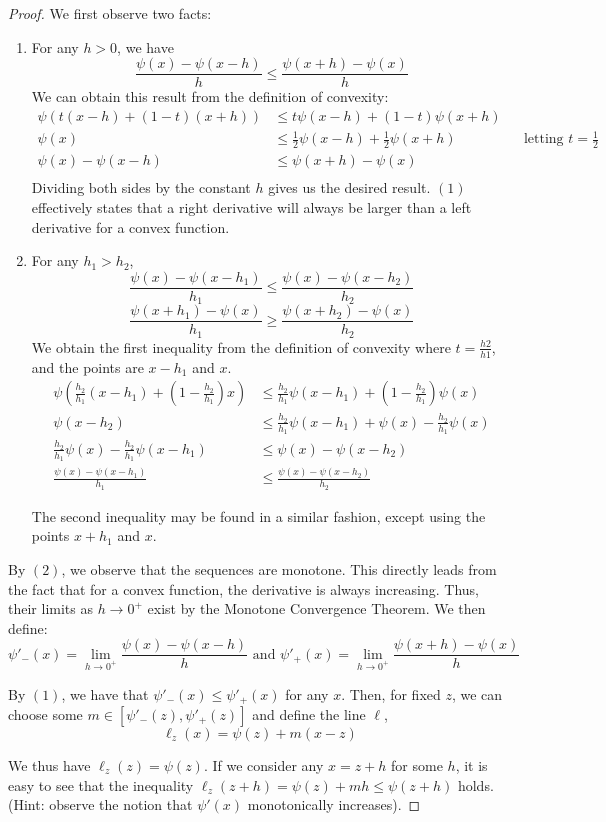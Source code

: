 \documentclass{article}
\begin{document}
\begin{proof}
We first observe two facts:
\begin{enumerate}
    \item For any $h > 0$, we have $$\frac{\psi(x)-\psi(x-h)}{h} \leq \frac{\psi(x+h)-\psi(x)}{h}$$
    We can obtain this result from the definition of convexity:
    \begin{align*}
        \psi(t(x-h) + (1-t)(x+h)) &\leq t\psi(x-h) + (1-t)\psi(x+h)\\
        \psi(x) &\leq \frac{1}{2}\psi(x-h)+\frac{1}{2}\psi(x+h)&&\text{letting $t = \frac{1}{2}$}\\
        \psi(x)-\psi(x-h) &\leq \psi(x+h)-\psi(x)\\
    \end{align*}
    Dividing both sides by the constant $h$ gives us the desired result. $(1)$
    effectively states that a right derivative will always be larger than a left
    derivative for a convex function.

    \item For any $h_1 > h_2$,
        $$\frac{\psi(x)-\psi(x-h_1)}{h_1} \leq \frac{\psi(x)-\psi(x-h_2)}{h_2}$$
        $$\frac{\psi(x+h_1) - \psi(x)}{h_1} \geq \frac{\psi(x+h_2)-\psi(x)}{h_2}$$
    We obtain the first inequality from the definition of convexity where $t = \frac{h2}{h1}$, and the points are $x-h_1$ and $x$.
    \begin{align*}
        \psi(\frac{h_2}{h_1}(x-h_1)+(1-\frac{h_2}{h_1})x) &\leq \frac{h_2}{h_1}\psi(x-h_1) + (1-\frac{h_2}{h_1})\psi(x)\\
        \psi(x-h_2) &\leq \frac{h_2}{h_1}\psi(x-h_1) + \psi(x) -\frac{h_2}{h_1}\psi(x)\\
        \frac{h_2}{h_1}\psi(x) - \frac{h_2}{h_1}\psi(x-h_1) &\leq \psi(x) - \psi(x-h_2)\\
        \frac{\psi(x)-\psi(x-h_1)}{h_1} &\leq \frac{\psi(x)-\psi(x-h_2)}{h_2}
    \end{align*}

    The second inequality may be found in a similar fashion, except using the
    points $x+h_1$ and $x$.
\end{enumerate}

By $(2)$, we observe that the sequences are monotone. This directly leads from
the fact that for a convex function, the derivative is always increasing. Thus,
their limits as $h \rightarrow 0^{+}$ exist by the Monotone Convergence Theorem.
We then define:
$$\psi'_{-}(x) = \lim_{h\rightarrow 0^{+}} \frac{\psi(x)-\psi(x-h)}{h} \text{ and } \psi'_{+}(x) = \lim_{h\rightarrow 0^{+}} \frac{\psi(x+h)-\psi(x)}{h}$$

By $(1)$, we have that $\psi'_{-}(x) \leq \psi'_{+}(x)$ for any $x$. Then, for
fixed $z$, we can choose some $m \in [\psi'_{-}(z), \psi'_{+}(z)]$ and define
the line $\ell$,
$$\ell_z(x) = \psi(z)+m(x-z)$$

We thus have $\ell_z(z) = \psi(z)$. If we consider any $x = z + h$ for some $h$,
it is easy to see that the inequality
$\ell_z(z+h) = \psi(z) + m h \leq \psi(z + h)$ holds.
(Hint: observe the notion that $\psi'(x)$ monotonically increases).
\end{proof}
\end{document}
